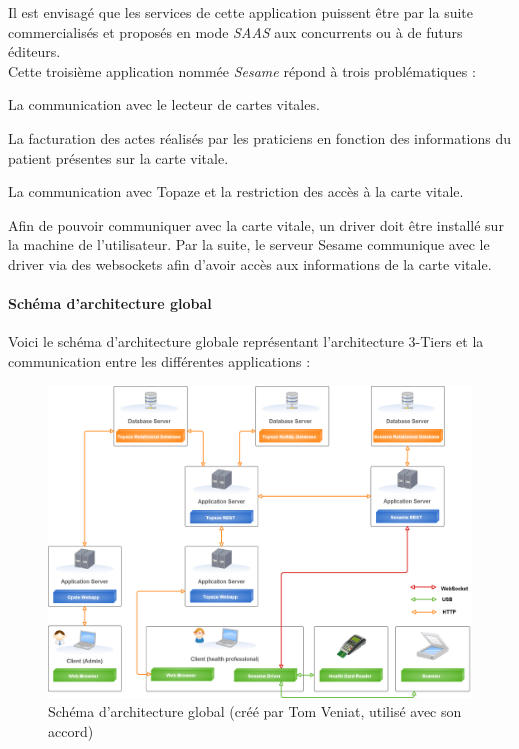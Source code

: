 Il est envisagé que les services de cette application puissent être par la suite commercialisés et proposés en mode \textit{SAAS} aux concurrents ou à de futurs éditeurs.\\

Cette troisième application nommée \textit{Sesame} répond à trois problématiques : 
\begin{sitemize}
\item La communication avec le lecteur de cartes vitales.
\item La facturation des actes réalisés par les praticiens en fonction des informations du patient présentes sur la carte vitale.
\item La communication avec Topaze et la restriction des accès à la carte vitale.
\end{sitemize}

Afin de pouvoir communiquer avec la carte vitale, un driver doit être installé sur la machine de l'utilisateur. Par la suite, le serveur Sesame communique avec le driver via des websockets afin d'avoir accès aux informations de la carte vitale.

\paragraph*{Schéma d'architecture global\\}
Voici le schéma d'architecture globale représentant l'architecture 3-Tiers et la communication entre les différentes applications :
\begin{figure}[H]
  \centering
  \centerline{\includegraphics[width=18cm]{./img/architecture5}}
  \caption{\label{fig:mb_va_ast} Schéma d'architecture global (créé par Tom Veniat, utilisé avec son accord)}
\end{figure}

